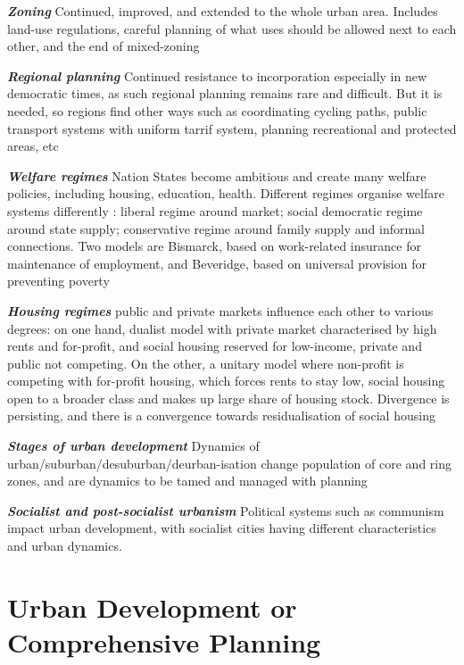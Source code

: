 \documentclass{article}
\newcommand{\bisection}[1]{\textbf{\textit{#1}}}
\newcommand{\alignedmarginpar}[1]{%
        \marginpar{\raggedright\small #1}
    }
\begin{document}
\bisection{Zoning} Continued, improved, and extended to the whole urban area. Includes land-use regulations, careful planning of what uses should be allowed next to each other, and the end of mixed-zoning

\bisection{Regional planning} Continued resistance to incorporation especially in new democratic times, as such regional planning remains rare and difficult. But it is needed, so regions find other ways such as coordinating cycling paths, public transport systems with uniform tarrif system, planning recreational and protected areas, etc

\bisection{Welfare regimes} Nation States become ambitious and create many welfare policies, including housing, education, health. Different regimes organise welfare systems differently\alignedmarginpar{Esping Anderson welfare triangle}: liberal regime around market; social democratic regime around state supply; conservative regime around family supply and informal connections. Two models are Bismarck, based on work-related insurance for maintenance of employment, and Beveridge, based on universal provision for preventing poverty

\bisection{Housing regimes} public and private markets influence each other to various degrees: on one hand, dualist model with private market characterised by high rents and for-profit, and social housing reserved for low-income, private and public not competing. On the other, a unitary model where non-profit is competing with for-profit housing, which forces rents to stay low, social housing open to a broader class and makes up large share of housing stock. Divergence is persisting, and there is a convergence towards residualisation of social housing

\bisection{Stages of urban development} Dynamics of urban/suburban/desuburban/deurban-isation change population of core and ring zones, and are dynamics to be tamed and managed with planning

\bisection{Socialist and post-socialist urbanism} Political systems such as communism impact urban development, with socialist cities having different characteristics and urban dynamics.

\pagebreak
\section{Urban Development or Comprehensive Planning}
\end{document}
